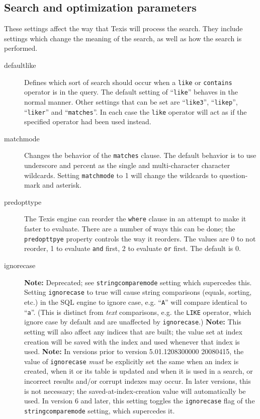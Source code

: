 \subsection{Search and optimization parameters}

These settings affect the way that Texis will process the search.  They
include settings which change the meaning of the search, as well as how
the search is performed.

\begin{description}
\item[defaultlike]

  Defines which sort of search should occur when a \verb`like` or
\verb`contains` operator is in the query.  The default setting of
``\verb`like`'' behaves in the normal manner.  Other settings that can
be set are ``\verb`like3`'', ``\verb`likep`'', ``\verb`liker`'' and
``\verb`matches`''.  In each case the \verb`like` operator will act as
if the specified operator had been used instead.

\item[matchmode]
  Changes the behavior of the \verb`matches` clause.  The default
behavior is to use underscore and percent as the single and
multi-character character wildcards.  Setting \verb`matchmode` to 1 will
change the wildcards to question-mark and asterisk.

\item[predopttype]
  The Texis engine can reorder the \verb`where` clause in an attempt
to make it faster to evaluate.  There are a number of ways this can be
done; the \verb`predopttpye` property controls the way it reorders.
The values are 0 to not reorder, 1 to evaluate \verb`and` first, 2 to
evaluate \verb`or` first.  The default is 0.

\item[ignorecase]
{\bf Note: } Deprecated; see \verb`stringcomparemode` setting which
supercedes this.
Setting \verb`ignorecase` to true will cause string comparisons
(equals, sorting, etc.) in the SQL engine to ignore case,
e.g. ``\verb`A`'' will compare identical to ``\verb`a`''.  (This is
distinct from {\em text} comparisons, e.g.  the \verb`LIKE` operator,
which ignore case by default and are unaffected by \verb`ignorecase`.)
{\bf Note:} This setting will also affect any indices that are built;
the value set at index creation will be saved with the index and used
whenever that index is used.  {\bf Note:} In versions prior to version
5.01.1208300000 20080415, the value of \verb`ignorecase` {\em must} be
explicitly set the same when an index is created, when it or its table
is updated and when it is used in a search, or incorrect results
and/or corrupt indexes may occur.  In later versions, this is not
necessary; the saved-at-index-creation value will automatically be
used.
In version 6 and later, this setting toggles the \verb`ignorecase`
flag of the \verb`stringcomparemode` setting, which supercedes it.


\end{description}
